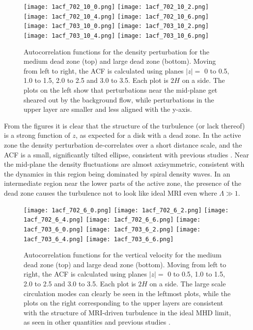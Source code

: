 \begin{figure*}[p]
\centering
\texttt{[image: 1acf\_702\_10\_0.png]}
\texttt{[image: 1acf\_702\_10\_2.png]}
\texttt{[image: 1acf\_702\_10\_4.png]}
\texttt{[image: 1acf\_702\_10\_6.png]}
\texttt{[image: 1acf\_703\_10\_0.png]}
\texttt{[image: 1acf\_703\_10\_2.png]}
\texttt{[image: 1acf\_703\_10\_4.png]}
\texttt{[image: 1acf\_703\_10\_6.png]}
\caption{Autocorrelation functions for the density perturbation for the medium dead zone (top) and large dead zone (bottom).  Moving from left to right, the ACF is calculated using planes $|z|=$ 0 to 0.5, 1.0 to 1.5, 2.0 to 2.5 and 3.0 to 3.5.  Each plot is $2H$ on a side.  The plots on the left show that perturbations near the mid-plane get sheared out by the background flow, while perturbations in the upper layer are smaller and less aligned with the y-axis.  }
\label{figACFdensPert}
\end{figure*}

From the figures it is clear that the structure of the turbulence (or lack thereof) is a strong function of $z$, as expected for a disk with a dead zone. In the active zone the density perturbation de-correlates over a short distance scale, and the 
ACF is a small, significantly tilted ellipse, consistent with previous studies \citep{guan09,simon12}. Near the mid-plane the density fluctuations are almost axisymmetric, consistent with the dynamics in this region being dominated by 
spiral density waves. In an intermediate region near the lower parts of the active zone, the presence of the dead zone causes the turbulence not to look like ideal MRI even where $\Lambda \gg 1$.

\begin{figure*}[p]
\centering
\texttt{[image: 1acf\_702\_6\_0.png]}
\texttt{[image: 1acf\_702\_6\_2.png]}
\texttt{[image: 1acf\_702\_6\_4.png]}
\texttt{[image: 1acf\_702\_6\_6.png]}
\texttt{[image: 1acf\_703\_6\_0.png]}
\texttt{[image: 1acf\_703\_6\_2.png]}
\texttt{[image: 1acf\_703\_6\_4.png]}
\texttt{[image: 1acf\_703\_6\_6.png]}
\caption{Autocorrelation functions for the vertical velocity for the medium dead zone (top) and large dead zone (bottom).  Moving from left to right, the ACF is calculated using planes $|z|=$ 0 to 0.5, 1.0 to 1.5, 2.0 to 2.5 and 3.0 to 3.5.  Each plot is $2H$ on a side.  The large scale circulation modes can clearly be seen in the leftmost plots, while the plots on the right corresponding to the upper layers are consistent with the structure of MRI-driven turbulence in the ideal MHD limit, as seen
in other quantities and previous studies \cite[e.g.,][]{guan09}. }
\label{figACFvel}
\end{figure*}

